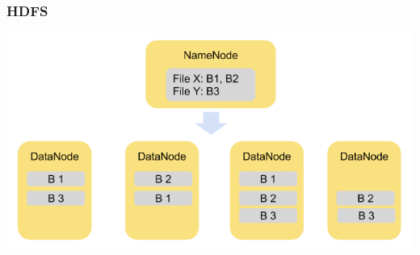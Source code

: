 \documentclass[14pt]{beamer}
\begin{document}
\begin{frame}[allowframebreaks]
  \frametitle{HDFS}
  \includegraphics[width=\textwidth]{img/hdfs1}
\end{frame}



\end{document}
